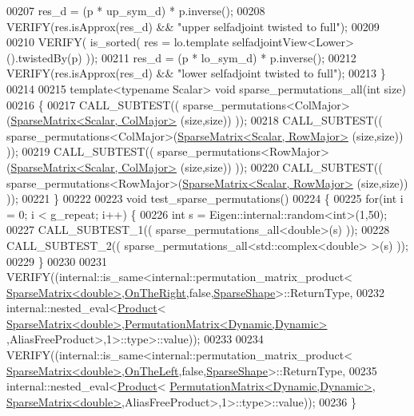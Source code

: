 \begin{DoxyCode}
00207   res\_d = (p * up\_sym\_d) * p.inverse();
00208   VERIFY(res.isApprox(res\_d) && \textcolor{stringliteral}{"upper selfadjoint twisted to full"});
00209   
00210   VERIFY( is\_sorted( res = lo.template selfadjointView<Lower>().twistedBy(p) ));
00211   res\_d = (p * lo\_sym\_d) * p.inverse();
00212   VERIFY(res.isApprox(res\_d) && \textcolor{stringliteral}{"lower selfadjoint twisted to full"});
00213 \}
00214 
00215 \textcolor{keyword}{template}<\textcolor{keyword}{typename} Scalar> \textcolor{keywordtype}{void} sparse\_permutations\_all(\textcolor{keywordtype}{int} size)
00216 \{
00217   CALL\_SUBTEST(( sparse\_permutations<ColMajor>(\hyperlink{group___sparse_core___module}{SparseMatrix<Scalar, ColMajor>}
      (size,size)) ));
00218   CALL\_SUBTEST(( sparse\_permutations<ColMajor>(\hyperlink{group___sparse_core___module}{SparseMatrix<Scalar, RowMajor>}
      (size,size)) ));
00219   CALL\_SUBTEST(( sparse\_permutations<RowMajor>(\hyperlink{group___sparse_core___module}{SparseMatrix<Scalar, ColMajor>}
      (size,size)) ));
00220   CALL\_SUBTEST(( sparse\_permutations<RowMajor>(\hyperlink{group___sparse_core___module}{SparseMatrix<Scalar, RowMajor>}
      (size,size)) ));
00221 \}
00222 
00223 \textcolor{keywordtype}{void} test\_sparse\_permutations()
00224 \{
00225   \textcolor{keywordflow}{for}(\textcolor{keywordtype}{int} i = 0; i < g\_repeat; i++) \{
00226     \textcolor{keywordtype}{int} s = Eigen::internal::random<int>(1,50);
00227     CALL\_SUBTEST\_1((  sparse\_permutations\_all<double>(s) ));
00228     CALL\_SUBTEST\_2((  sparse\_permutations\_all<std::complex<double> >(s) ));
00229   \}
00230 
00231   VERIFY((internal::is\_same<internal::permutation\_matrix\_product<
      \hyperlink{group___sparse_core___module}{SparseMatrix<double>},\hyperlink{group__enums_ggac22de43beeac7a78b384f99bed5cee0ba99dc75d8e00b6c3a5bdc31940f47492b}{OnTheRight},\textcolor{keyword}{false},\hyperlink{struct_eigen_1_1_sparse_shape}{SparseShape}>::ReturnType,
00232                             internal::nested\_eval<\hyperlink{group___core___module_class_eigen_1_1_product}{Product}<
      \hyperlink{group___sparse_core___module}{SparseMatrix<double>},\hyperlink{group___core___module}{PermutationMatrix<Dynamic,Dynamic>}
      ,AliasFreeProduct>,1>::type>::value));
00233 
00234   VERIFY((internal::is\_same<internal::permutation\_matrix\_product<
      \hyperlink{group___sparse_core___module}{SparseMatrix<double>},\hyperlink{group__enums_ggac22de43beeac7a78b384f99bed5cee0ba129609b3bdf23b071f5f86cf2f995ec4}{OnTheLeft},\textcolor{keyword}{false},\hyperlink{struct_eigen_1_1_sparse_shape}{SparseShape}>::ReturnType,
00235                             internal::nested\_eval<\hyperlink{group___core___module_class_eigen_1_1_product}{Product}<
      \hyperlink{group___core___module}{PermutationMatrix<Dynamic,Dynamic>},
      \hyperlink{group___sparse_core___module}{SparseMatrix<double>},AliasFreeProduct>,1>::type>::value));
00236 \}
\end{DoxyCode}
